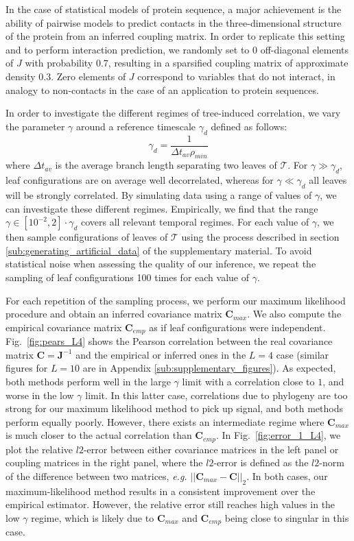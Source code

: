 \documentclass[preprint,amsmath,amssymb,superscriptaddress,showpacs,pre]{revtex4-1}
\begin{document}
In the case of statistical models of protein sequence, a major achievement is the ability of pairwise models to predict contacts in the three-dimensional structure of the protein from an inferred coupling matrix.
In order to replicate this setting and to perform interaction prediction, we randomly set to $0$ off-diagonal elements of $J$ with probability $0.7$, resulting in a sparsified coupling matrix of approximate density $0.3$.  
Zero elements of $J$ correspond to variables that do not interact, in analogy to non-contacts in the case of an application to protein sequences.  


In order to investigate the different regimes of tree-induced correlation, we vary the parameter $\gamma$ around a reference timescale $\gamma_d$ defined as follows: 
\begin{equation}
    \gamma_d = \frac{1}{\Delta t_{av}\rho_{min}} 
\end{equation}
where $\Delta t_{av}$ is the average branch length separating two leaves of $\mathcal{T}$. 
For $\gamma \gg \gamma_d$, leaf configurations are on average well decorrelated, whereas for $\gamma \ll \gamma_d$ all leaves will be strongly correlated. 
By simulating data using a range of values of $\gamma$, we can investigate these different regimes. 
Empirically, we find that the range $\gamma\in[10^{-2},2]\cdot\gamma_d$ covers all relevant temporal regimes.  
For each value of $\gamma$, we then sample  configurations of leaves of $\mathcal{T}$ using the process described in section \ref{sub:generating_artificial_data} of the supplementary material. 
To avoid statistical noise when assessing the quality of our inference, we repeat the sampling of leaf configurations 100 times for each value of $\gamma$.

For each repetition of the sampling process, we perform our maximum likelihood procedure and obtain an inferred covariance matrix $\bm{C}_{max}$. 
We also compute the empirical covariance matrix $\bm{C}_{emp}$ as if leaf configurations were independent. 
Fig.~\ref{fig:pears_L4} shows the Pearson correlation between the real covariance matrix $\bm{C}=\bm{J}^{-1}$ and the empirical or inferred ones in the $L=4$ case (similar figures for $L=10$ are in Appendix \ref{sub:supplementary_figures}). 
As expected, both methods perform well in the large $\gamma$ limit with a correlation close to $1$, and worse in the low $\gamma$ limit. 
In this latter case, correlations due to phylogeny are too strong for our maximum likelihood method to pick up signal, and both methods perform equally poorly. 
However, there exists an intermediate regime where $\bm{C}_{max}$ is much closer to the actual correlation than  $\bm{C}_{emp}$. 
In Fig.~\ref{fig:error_1_L4}, we plot the relative $l2$-error between either covariance matrices in the left panel or coupling matrices in the right panel, where the $l2$-error is defined as the $l2$-norm of the difference between two matrices, \emph{e.g.} $\vert\vert\bm{C}_{max} - \bm{C}\vert\vert_2$. 
In both cases, our maximum-likelihood method results in a consistent improvement over the empirical estimator. 
However, the relative error still reaches high values in the low $\gamma$ regime, which is likely due to $\bm{C}_{max}$ and $\bm{C}_{emp}$ being close to singular in this case. 
\end{document}
